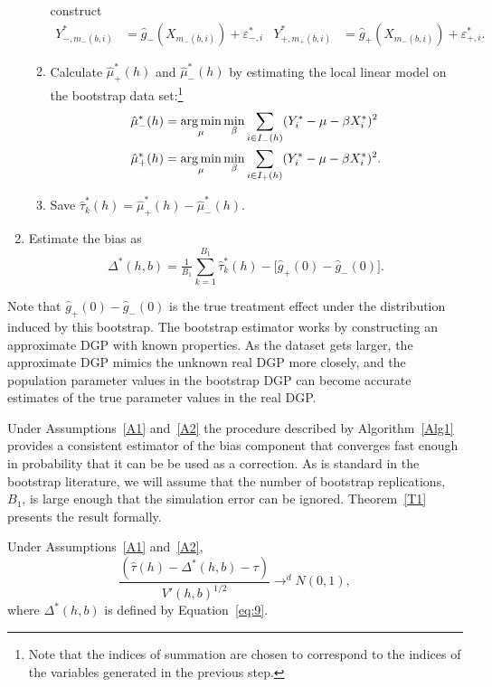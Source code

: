 \documentclass[12pt,fleqn]{article}
\begin{document}
\begin{algorithm}
\begin{enumerate}
\begin{enumerate}
      construct
      \begin{align*}
        Y_{-,m_-(b,i)}^* &= \hat g_-(X_{m_-(b,i)}) + \varepsilon_{-,i}^{*} &
        Y_{+,m_+(b,i)}^* &= \hat g_+(X_{m_-(b,i)}) + \varepsilon_{+,i}^{*}.
      \end{align*}
    \item Calculate $\hat\mu_+^*(h)$ and $\hat\mu_-^*(h)$ by estimating the
      local linear model on the bootstrap data set:\footnote{%
        Note that the indices of summation are chosen to correspond to the
        indices of the variables generated in the previous step.} %
      \begin{align*}
        \hat\mu_-^*(h)
        &= \argmin_{\mu} \min_{\beta} \ssum[-]{i}{h}
          (Y_i^* - \mu - \beta X_i^*)^2 \\
        \hat\mu_+^*(h)
        &= \argmin_{\mu} \min_{\beta} \ssum[+]{i}{h}
          (Y_i^* - \mu - \beta X_i^*)^2.
      \end{align*}
    \item Save $\hat\tau^*_k(h) = \hat\mu_+^*(h) - \hat\mu_-^*(h)$.
    \end{enumerate}
  \item Estimate the bias as
    \begin{equation}
      \label{eq:9}
      \Delta^*(h,b) = \tfrac{1}{B_1} \sum_{k=1}^{B_1} \hat\tau^*_k(h) -
      \big[\hat g_+(0) - \hat g_-(0)\big].
    \end{equation}
  \end{enumerate}
\end{algorithm}
Note that $\hat g_+(0) - \hat g_-(0)$ is the true treatment effect under the
distribution induced by this bootstrap. The bootstrap estimator works by
constructing an approximate DGP with known properties. As the dataset gets
larger, the approximate DGP mimics the unknown real DGP more closely, and the
population parameter values in the bootstrap DGP can become accurate estimates
of the true parameter values in the real DGP.

Under Assumptions~\ref{A1} and~\ref{A2} the procedure described by
Algorithm~\ref{Alg1} provides a consistent estimator of the bias component that
converges fast enough in probability that it can be be used as a correction. As
is standard in the bootstrap literature, we will assume that the number of
bootstrap replications, $B_{1}$, is large enough that the simulation error can
be ignored. Theorem~\ref{T1} presents the result formally.

\begin{theorem}\label{T1}
  Under Assumptions~\ref{A1} and~\ref{A2},
\begin{equation}
  \label{eq:4}
  \frac{(\hat\tau(h) - \Delta^{*}(h,b) - \tau)}{ V'(h, b)^{1/2}}
  \to^{d} N(0,1),
\end{equation}
where $\Delta^*(h,b)$ is defined by Equation~\ref{eq:9}.
\end{theorem}
\end{document}
